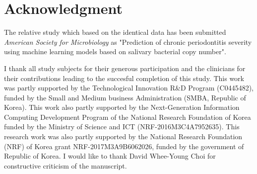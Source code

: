 \documentclass[aps, 11pt, a4paper]{article}
\begin{document}
    \section{Acknowledgment}
    	The relative study which based on the identical data has been submitted \textit{American Society for Microbiology} as "Prediction of chronic periodontitis severity using machine learning models based on salivary bacterial copy number". 
    	
    	I thank all study subjects for their generous participation and the clinicians for their contributions leading to the succesful completion of this study. This work was partly supported by the Technological Innovation R\&D Program (C0445482), funded by the Small and Medium business Administration (SMBA, Republic of Korea). This work also partly supported by the Next-Generation Information Computing Development Program of the National Research Foundation of Korea funded by the Ministry of Science and ICT (NRF-2016M3C4A7952635). This research work was also partly supported by the National Research Foundation (NRF) of Korea grant NRF-2017M3A9B6062026, funded by the government of Republic of Korea. I would like to thank David Whee-Young Choi for constructive criticism of the manuscript. 
    
    
    
\end{document}
